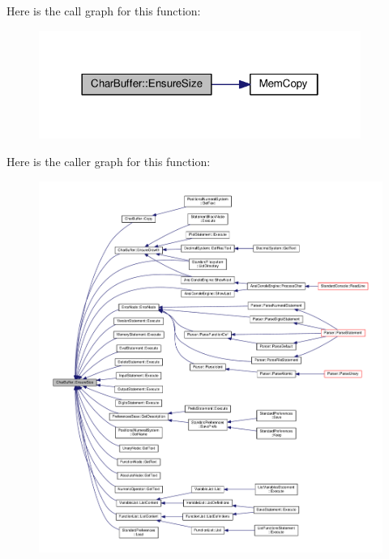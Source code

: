 Here is the call graph for this function\+:
\nopagebreak
\begin{figure}[H]
\begin{center}
\leavevmode
\includegraphics[width=298pt]{dc/d84/classCharBuffer_ad1907009b5ad136692b989fa96bf2f7e_cgraph}
\end{center}
\end{figure}




Here is the caller graph for this function\+:
\nopagebreak
\begin{figure}[H]
\begin{center}
\leavevmode
\includegraphics[width=350pt]{dc/d84/classCharBuffer_ad1907009b5ad136692b989fa96bf2f7e_icgraph}
\end{center}
\end{figure}


